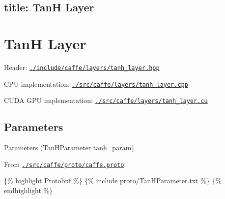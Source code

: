 

 \subsection*{title\+: TanH Layer }

\section*{TanH Layer}


\begin{DoxyItemize}
\item Header\+: \href{https://github.com/BVLC/caffe/blob/master/include/caffe/layers/tanh_layer.hpp}{\tt {\ttfamily ./include/caffe/layers/tanh\+\_\+layer.hpp}}
\item C\+PU implementation\+: \href{https://github.com/BVLC/caffe/blob/master/src/caffe/layers/tanh_layer.cpp}{\tt {\ttfamily ./src/caffe/layers/tanh\+\_\+layer.cpp}}
\item C\+U\+DA G\+PU implementation\+: \href{https://github.com/BVLC/caffe/blob/master/src/caffe/layers/tanh_layer.cu}{\tt {\ttfamily ./src/caffe/layers/tanh\+\_\+layer.cu}}
\end{DoxyItemize}

\subsection*{Parameters}


\begin{DoxyItemize}
\item Parameters ({\ttfamily Tan\+H\+Parameter tanh\+\_\+param})
\item From \href{https://github.com/BVLC/caffe/blob/master/src/caffe/proto/caffe.proto}{\tt {\ttfamily ./src/caffe/proto/caffe.proto}}\+:
\end{DoxyItemize}

\{\% highlight Protobuf \%\} \{\% include proto/\+Tan\+H\+Parameter.\+txt \%\} \{\% endhighlight \%\} 
